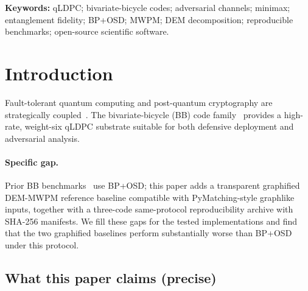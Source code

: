 \documentclass[11pt,a4paper]{article}
\begin{document}
\noindent\textbf{Keywords:} qLDPC; bivariate-bicycle codes; adversarial
channels; minimax; entanglement fidelity; BP+OSD; MWPM; DEM decomposition;
reproducible benchmarks; open-source scientific software.

\section{Introduction}

Fault-tolerant quantum computing and post-quantum cryptography are
strategically coupled~\cite{Shor1997,NISTFIPS203,NISTFIPS204,NISTFIPS205}.
The bivariate-bicycle (BB) code family~\cite{Bravyi2024} provides a
high-rate, weight-six qLDPC substrate suitable for both defensive
deployment and adversarial analysis.

\paragraph{Specific gap.}
Prior BB benchmarks~\cite{Bravyi2024,ShawRengaswamy2026} use BP+OSD;
this paper adds a transparent graphified DEM-MWPM reference baseline compatible with PyMatching-style graphlike inputs, together with a three-code same-protocol reproducibility archive with SHA-256 manifests.
We fill these gaps for the tested implementations and find that the two graphified baselines perform substantially worse than BP+OSD under this protocol.

\subsection{What this paper claims (precise)}
\end{document}
